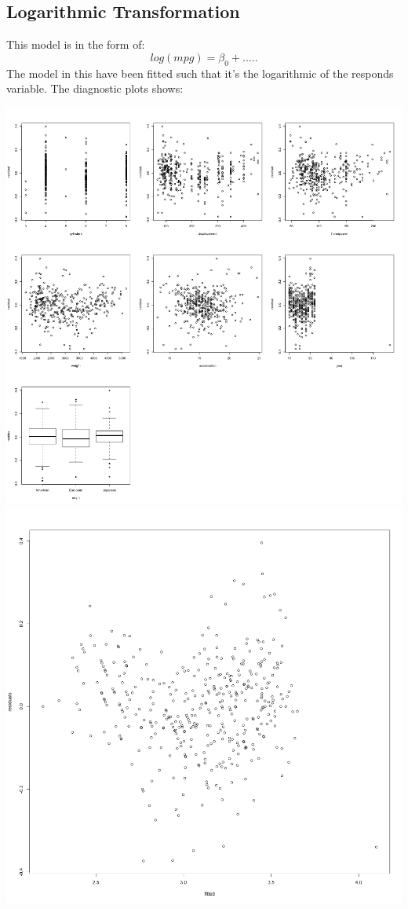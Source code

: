 \documentclass[11pt]{article} %
\begin{document}
\subsection{Logarithmic Transformation}
This model is in the form of:
$$
log(mpg)= \beta_0 +.....
$$
The model in this have been fitted such that it's the logarithmic of the responds variable. The diagnostic plots shows:
\begin{center}
\includegraphics[scale=0.13]{3_res_vs_value}
\includegraphics[scale=0.13]{3_res_vs_fitted}
\end{center}
\end{document}
